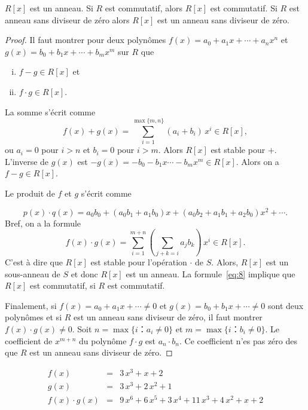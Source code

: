 \begin{theorem}
  \label{thr:51}
  $R[x]$ est un anneau. Si $R$ est commutatif, alors $R[x]$ est commutatif. Si $R$ est anneau sans diviseur de zéro    alors $R[x]$ est un  anneau sans diviseur de zéro. 
\end{theorem}
\begin{proof}
  Il faut montrer
  pour deux polynômes $f(x) = a_0 + a_1 x + \cdots + a_n x^n$ et $g(x) = b_0 + b_1x + \cdots + b_m x^m$ sur $R$ que
  \begin{enumerate}[i)]
  \item $f- g ∈ R[x]$ et
  \item $f ⋅ g ∈R[x]$. 
  \end{enumerate}
  La somme s'écrit comme
  \begin{equation}
    \label{eq:47}
    f(x) + g(x) = ∑_{i=1}^{\max\{m,n\}} (a_i +  b_i) \, x^i  ∈R[x], 
  \end{equation}
  ou $a_i = 0$ pour $i>n$ et $b_i = 0$ pour $i>m$. 
  Alors   $R[x]$ est stable pour $+$. 
  L'inverse de $g(x)$ est $-g(x) = -b_0 - b_1 x  \cdots - b_m x^m ∈ R[x]$. Alors
  on a $f-g ∈ R[x]$. 
  
  Le    produit de $f$ et $g$ s'écrit comme

  \begin{equation}
  \label{ceq:21}
  p(x) ⋅q(x) = a_0 b_0 + (a_0b_1 +a_1b_0) x + (a_0b_2+ a_1b_1 + a_2b_0)x^2 + \cdots .
\end{equation}
Bref, on a la formule 
  \begin{equation}
    \label{eq:8}
    f(x) ⋅g(x) = ∑_{i=1}^{m+n} ( ∑_{j+k = i} a_j b_k) \, x^i ∈ R[x]. 
  \end{equation}
  C'est à dire que $R[x]$ est stable pour l'opération $⋅$ de $S$.  Alors, $R[x]$ est un sous-anneau de $S$ et 
  donc $R[x]$ est un anneau. La formule~\eqref{eq:8} implique que
  $R[x]$ est commutatif, si $R$ est commutatif.

  Finalement, si $f(x) = a_0 + a_1 x + \cdots ≠ 0$ et
  $g(x) = b_0 + b_1 x + \cdots ≠ 0 $ sont deux polynômes et si $R$ est un 
  anneau sans diviseur de zéro, il faut montrer $f(x) ⋅ g(x) ≠
  0$. Soit $n = \max\{ i ：a_i ≠0 \}$ et $m = \max\{ i ：b_i ≠0 \}$. Le coefficient de $x^{m+n}$ du polynôme $f⋅g$ est $a_n ⋅b_n$. Ce coefficient n'es pas zéro des que $R$  est un 
  anneau sans diviseur de zéro. 
\end{proof}

\begin{example}
  \label{exe:33}
  \begin{eqnarray*}
    f(x) & = &  3 \, x^{3} + x + 2 \\
    g(x) & = & 3 \, x^{3} + 2 \, x^{2} + 1 \\
    f(x) ⋅g(x) & = & 9 \, x^{6} + 6 \, x^{5} + 3 \, x^{4} + 11 \, x^{3} + 4 \,  x^{2} + x + 2 \\ 
  \end{eqnarray*}
\end{example}



